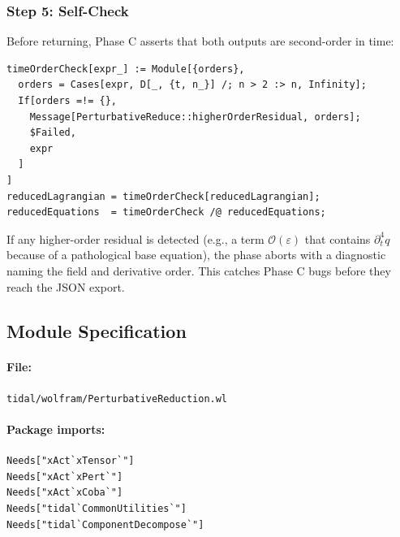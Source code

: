\subsubsection{Step 5: Self-Check}

Before returning, Phase C asserts that both outputs are second-order in time:
\begin{verbatim}
timeOrderCheck[expr_] := Module[{orders},
  orders = Cases[expr, D[_, {t, n_}] /; n > 2 :> n, Infinity];
  If[orders =!= {},
    Message[PerturbativeReduce::higherOrderResidual, orders];
    $Failed,
    expr
  ]
]
reducedLagrangian = timeOrderCheck[reducedLagrangian];
reducedEquations  = timeOrderCheck /@ reducedEquations;
\end{verbatim}

If any higher-order residual is detected (e.g., a term $\mathcal{O}(\varepsilon)$ that contains $\partial_t^4 q$ because of a pathological base equation), the phase aborts with a diagnostic naming the field and derivative order. This catches Phase C bugs before they reach the JSON export.

\subsection{Module Specification}
\label{sec:prd-module}

\paragraph{File:} \texttt{tidal/wolfram/PerturbativeReduction.wl}

\paragraph{Package imports:}
\begin{verbatim}
Needs["xAct`xTensor`"]
Needs["xAct`xPert`"]
Needs["xAct`xCoba`"]
Needs["tidal`CommonUtilities`"]
Needs["tidal`ComponentDecompose`"]
\end{verbatim}

